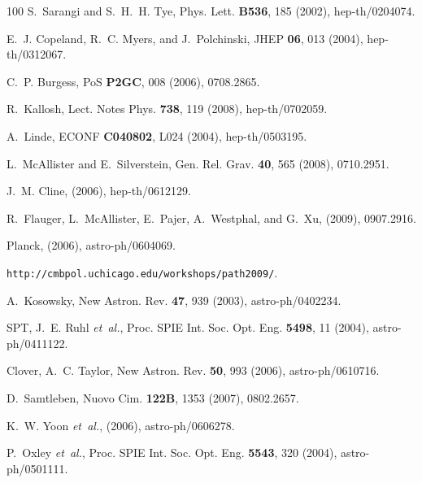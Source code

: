 \documentclass[12pt,letterpaper,rotate]{article}
\begin{document}
{\begin{thebibliography}{100}
S.~Sarangi and S.~H.~H. Tye,
\newblock Phys. Lett. {\bf B536}, 185 (2002), hep-th/0204074.

E.~J. Copeland, R.~C. Myers, and J.~Polchinski,
\newblock JHEP {\bf 06}, 013 (2004), hep-th/0312067.

C.~P. Burgess,
\newblock PoS {\bf P2GC}, 008 (2006), 0708.2865.

R.~Kallosh,
\newblock Lect. Notes Phys. {\bf 738}, 119 (2008), hep-th/0702059.

A.~Linde,
\newblock ECONF {\bf C040802}, L024 (2004), hep-th/0503195.

L.~McAllister and E.~Silverstein,
\newblock Gen. Rel. Grav. {\bf 40}, 565 (2008), 0710.2951.

J.~M. Cline,
\newblock (2006), hep-th/0612129.

R.~Flauger, L.~McAllister, E.~Pajer, A.~Westphal, and G.~Xu,
\newblock (2009), 0907.2916.

Planck,
\newblock (2006), astro-ph/0604069.

{\tt http://cmbpol.uchicago.edu/workshops/path2009/}.

A.~Kosowsky,
\newblock New Astron. Rev. {\bf 47}, 939 (2003), astro-ph/0402234.

SPT, J.~E. Ruhl {\em et~al.},
\newblock Proc. SPIE Int. Soc. Opt. Eng. {\bf 5498}, 11 (2004),
  astro-ph/0411122.

Clover, A.~C. Taylor,
\newblock New Astron. Rev. {\bf 50}, 993 (2006), astro-ph/0610716.

D.~Samtleben,
\newblock Nuovo Cim. {\bf 122B}, 1353 (2007), 0802.2657.

K.~W. Yoon {\em et~al.},
\newblock (2006), astro-ph/0606278.

P.~Oxley {\em et~al.},
\newblock Proc. SPIE Int. Soc. Opt. Eng. {\bf 5543}, 320 (2004),
  astro-ph/0501111.


\end{thebibliography}}
\end{document}
